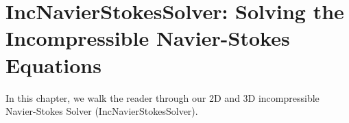 \chapter{IncNavierStokesSolver: Solving the Incompressible Navier-Stokes Equations}

In this chapter, we walk the reader through our 2D and 3D incompressible Navier-Stokes Solver (IncNavierStokesSolver).
